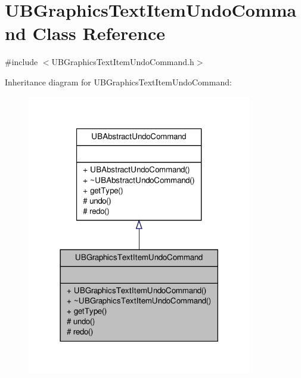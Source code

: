 \hypertarget{class_u_b_graphics_text_item_undo_command}{\section{U\-B\-Graphics\-Text\-Item\-Undo\-Command Class Reference}
\label{db/dc5/class_u_b_graphics_text_item_undo_command}
}


{\ttfamily \#include $<$U\-B\-Graphics\-Text\-Item\-Undo\-Command.\-h$>$}



Inheritance diagram for U\-B\-Graphics\-Text\-Item\-Undo\-Command\-:
\nopagebreak
\begin{figure}[H]
\begin{center}
\leavevmode
\includegraphics[width=278pt]{d2/d3a/class_u_b_graphics_text_item_undo_command__inherit__graph}
\end{center}
\end{figure}


